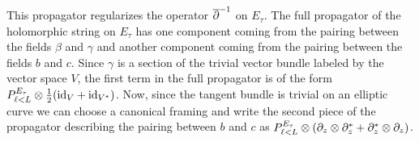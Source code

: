 This propagator regularizes the operator $\overline{\partial}^{-1}$ on $E_\tau$. 
The full propagator of the holomorphic string on $E_\tau$ has one component coming from the pairing between the fields $\beta$ and $\gamma$ and another component coming from the pairing between the fields $b$ and $c$. 
Since $\gamma$ is a section of the trivial vector bundle labeled by the vector space $V$, the first term in the full propagator is of the form $P_{\ell < L}^{E_\tau} \otimes \frac{1}{2} ({\rm id}_V + {\rm id}_{V^*})$.
Now, since the tangent bundle is trivial on an elliptic curve we can choose a canonical framing and write the second piece of the propagator describing the pairing between $b$ and $c$ as $P_{\ell < L}^{E_\tau} \otimes (\partial_z \otimes \partial_z^* + \partial_z^* \otimes \partial_z)$.





